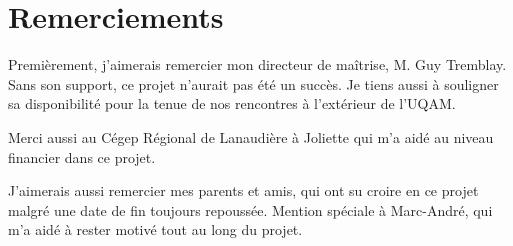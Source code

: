 \chapter*{Remerciements}

Premi\`erement, j'aimerais remercier mon directeur de ma\^itrise, M. Guy Tremblay.
Sans son support, ce projet n'aurait pas \'et\'e un succ\`es.
Je tiens aussi \`a souligner sa disponibilit\'e pour la tenue de nos rencontres \`a l'ext\'erieur de l'UQAM.

Merci aussi au C\'egep R\'egional de Lanaudi\`ere \`a Joliette qui m'a aid\'e au niveau financier dans ce projet.

J'aimerais aussi remercier mes parents et amis, qui ont su croire en ce projet malgr\'e une date de fin toujours repouss\'ee.
Mention sp\'eciale \`a Marc-Andr\'e, qui m'a aid\'e \`a rester motiv\'e tout au long du projet.
